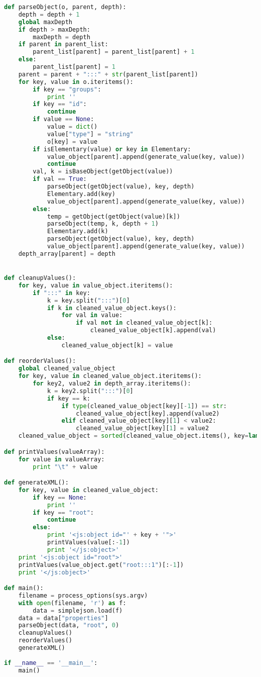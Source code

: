 \begin{lstlisting}[language=python]
def parseObject(o, parent, depth):
	depth = depth + 1
	global maxDepth
	if depth > maxDepth:
		maxDepth = depth
	if parent in parent_list:
		parent_list[parent] = parent_list[parent] + 1
	else:
		parent_list[parent] = 1
	parent = parent + ":::" + str(parent_list[parent])
	for key, value in o.iteritems():
		if key == "groups":
			print ''
		if key == "id":
			continue
		if value == None:
			value = dict()
			value["type"] = "string"
			o[key] = value
		if isElementary(value) or key in Elementary:
			value_object[parent].append(generate_value(key, value))
			continue
		val, k = isBaseObject(getObject(value))
		if val == True:
			parseObject(getObject(value), key, depth)
			Elementary.add(key)
			value_object[parent].append(generate_value(key, value))
		else:
			temp = getObject(getObject(value)[k])
			parseObject(temp, k, depth + 1)
			Elementary.add(k)
			parseObject(getObject(value), key, depth)
			value_object[parent].append(generate_value(key, value))
	depth_array[parent] = depth


def cleanupValues():
	for key, value in value_object.iteritems():
		if ":::" in key:
			k = key.split(":::")[0]
			if k in cleaned_value_object.keys():
				for val in value:
					if val not in cleaned_value_object[k]:
						cleaned_value_object[k].append(val)
			else:
				cleaned_value_object[k] = value

def reorderValues():
	global cleaned_value_object
	for key, value in cleaned_value_object.iteritems():
		for key2, value2 in depth_array.iteritems():
			k = key2.split(":::")[0]
			if key == k:
				if type(cleaned_value_object[key][-1]) == str:
					cleaned_value_object[key].append(value2)
				elif cleaned_value_object[key][1] < value2:
					cleaned_value_object[key][1] = value2
	cleaned_value_object = sorted(cleaned_value_object.items(), key=lambda x: x[1][-1], reverse=True)

def printValues(valueArray):
	for value in valueArray:
		print "\t" + value

def generateXML():
	for key, value in cleaned_value_object:
		if key == None:
			print ''
		if key == "root":
			continue
		else:
			print '<js:object id="' + key + '">'
			printValues(value[:-1])
			print '</js:object>'
	print '<js:object id="root">'
	printValues(value_object.get("root:::1")[:-1])
	print '</js:object>'

def main():
	filename = process_options(sys.argv)
	with open(filename, 'r') as f:
		data = simplejson.load(f)
	data = data["properties"]
	parseObject(data, "root", 0)
	cleanupValues()
	reorderValues()
	generateXML()
			
if __name__ == '__main__':
	main()
\end{lstlisting}